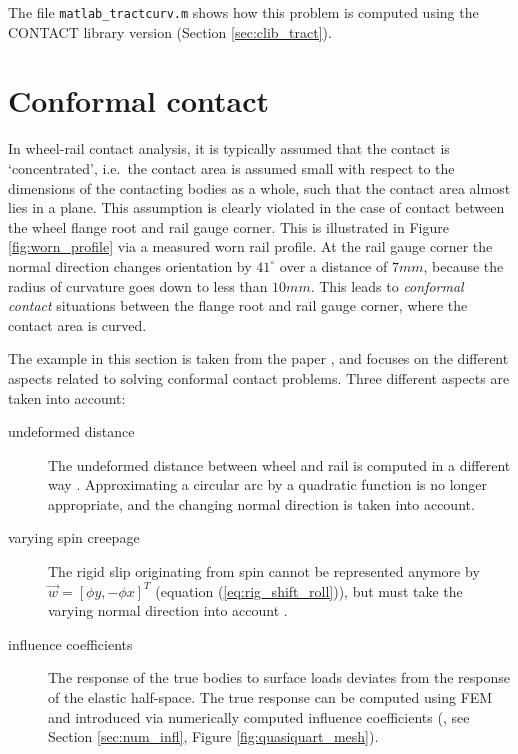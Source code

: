 \documentclass[12pt]{report}
\begin{document}
The file {\tt matlab\_tractcurv.m} shows how this problem is computed
using the CONTACT library version (Section \ref{sec:clib_tract}).

\section{Conformal contact}
\label{sec:ex_conformal}

In wheel-rail contact analysis, it is typically assumed that the contact is
`concentrated', i.e.\ the contact area is assumed small with respect to
the dimensions of the contacting bodies as a whole, such that the contact
area almost lies in a plane. This
assumption is clearly violated in the case of contact between the wheel
flange root and rail gauge corner. This is illustrated in Figure
\ref{fig:worn_profile} via a measured worn rail profile. At the rail
gauge corner the normal direction changes orientation by $41^\circ$ over a
distance of $7\unit{mm}$, because the radius of curvature goes down to less than
$10\unit{mm}$. This leads to {\em conformal contact\/} situations between the
flange root and rail gauge corner, where the contact area is curved.

The example in this section is taken from the paper
\cite{Vollebregt2018b-corrigendum}, and focuses on the different aspects
related to solving conformal contact problems. 
Three different aspects are taken into account:
\begin{description}
\item[undeformed distance] The undeformed distance between wheel and rail
is computed in a different way \cite{Vollebregt2014d-conformal}. 
Approximating a circular arc by a quadratic function is no longer
appropriate, and the changing normal direction is taken into account.
\item[varying spin creepage] The rigid slip originating from spin cannot be
represented anymore by $\vec{w}=[\phi y, -\phi x]^T$ (equation 
(\ref{eq:rig_shift_roll})), but must take the varying normal direction
into account \cite{Li_zili2002-phd-thesis}.
\item[influence coefficients] The response of the true bodies to surface
loads deviates from the response of the elastic half-space. The true
response can be computed using FEM and introduced via numerically computed
influence coefficients (\cite{Vollebregt2014d-conformal}, see Section
\ref{sec:num_infl}, Figure \ref{fig:quasiquart_mesh}).
\end{description}
\end{document}
